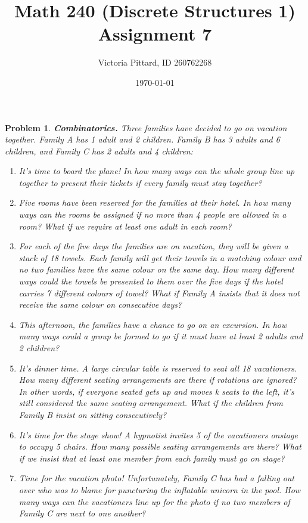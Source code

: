 \documentclass{article}
\newtheorem{problem}{Problem}
\theoremstyle{definition}
\begin{document}
\title{Math 240 (Discrete Structures 1) Assignment 7}
\author{Victoria Pittard, ID 260762268}
\date{\today}

\maketitle

\begin{problem}\textbf{Combinatorics. }
Three families have decided to go on vacation together. Family A has 1 adult and 2 children. Family B has 3 adults and 6 children, and Family C has 2 adults and 4 children:
\begin{enumerate}[label = \alph*)]
    \item It's time to board the plane! In how many ways can the whole group line up together to present their tickets if every family must stay together?
    
    \item Five rooms have been reserved for the families at their hotel. In how many ways can the rooms be assigned if no more than 4 people are allowed in a room? What if we require at least one adult in each room?
    
    \item For each of the five days the families are on vacation, they will be given a stack of 18 towels. Each family will get their towels in a matching colour and no two families have the same colour on the same day. How many different ways could the towels be presented to them over the five days if the hotel carries 7 different colours of towel? What if Family A insists that it does not receive the same colour on consecutive days?
    
    \item This afternoon, the families have a chance to go on an excursion. In how many ways could a group be formed to go if it must have at least 2 adults and 2 children?
    
    \item It's dinner time. A large circular table is reserved to seat all 18 vacationers. How many different seating arrangements are there if rotations are ignored? In other words, if everyone seated gets up and moves k seats to the left, it's still considered the same seating arrangement. What if the children from Family B insist on sitting consecutively?
    
    \item It's time for the stage show! A hypnotist invites 5 of the vacationers onstage to occupy 5 chairs. How many possible seating arrangements are there? What if we insist that at least one member from each family must go on stage?
    
    \item Time for the vacation photo! Unfortunately, Family C has had a falling out over who was to blame for puncturing the inflatable unicorn in the pool. How many ways can the vacationers line up for the photo if no two members of Family C are next to one another?
\end{enumerate}
\end{problem}
\end{document}
